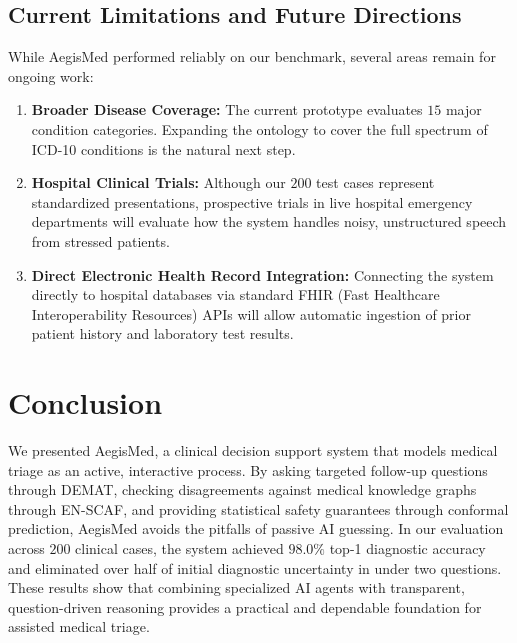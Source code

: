 \documentclass[10pt,twocolumn]{article}
\begin{document}
\subsection{Current Limitations and Future Directions}
While AegisMed performed reliably on our benchmark, several areas remain for ongoing work:
\begin{enumerate}
    \item \textbf{Broader Disease Coverage:} The current prototype evaluates $15$ major condition categories. Expanding the ontology to cover the full spectrum of ICD-10 conditions is the natural next step.
    \item \textbf{Hospital Clinical Trials:} Although our $200$ test cases represent standardized presentations, prospective trials in live hospital emergency departments will evaluate how the system handles noisy, unstructured speech from stressed patients.
    \item \textbf{Direct Electronic Health Record Integration:} Connecting the system directly to hospital databases via standard FHIR (Fast Healthcare Interoperability Resources) APIs will allow automatic ingestion of prior patient history and laboratory test results.
\end{enumerate}

\section{Conclusion}

We presented AegisMed, a clinical decision support system that models medical triage as an active, interactive process. By asking targeted follow-up questions through DEMAT, checking disagreements against medical knowledge graphs through EN-SCAF, and providing statistical safety guarantees through conformal prediction, AegisMed avoids the pitfalls of passive AI guessing. In our evaluation across $200$ clinical cases, the system achieved $98.0\%$ top-1 diagnostic accuracy and eliminated over half of initial diagnostic uncertainty in under two questions. These results show that combining specialized AI agents with transparent, question-driven reasoning provides a practical and dependable foundation for assisted medical triage.



\end{document}
